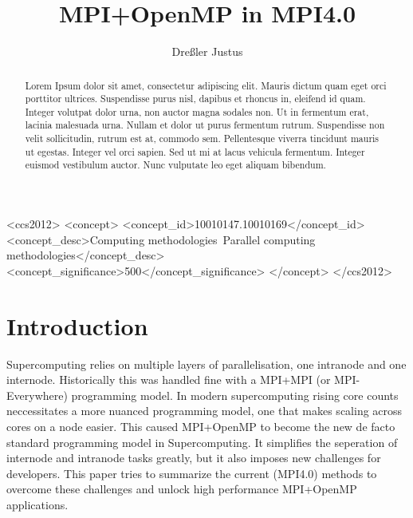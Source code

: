 \documentclass[sigconf]{acmart} %
\begin{document}
\title{MPI+OpenMP in MPI4.0}
\author{Dreßler Justus}


\begin{CCSXML}
    <ccs2012>
    <concept>
    <concept_id>10010147.10010169</concept_id>
    <concept_desc>Computing methodologies~Parallel computing methodologies</concept_desc>
    <concept_significance>500</concept_significance>
    </concept>
    </ccs2012>
\end{CCSXML}


\begin{abstract}

    Lorem Ipsum dolor sit amet, consectetur adipiscing elit.
    Mauris dictum quam eget orci porttitor ultrices.
    Suspendisse purus nisl, dapibus et rhoncus in, eleifend id quam. Integer volutpat dolor urna, non auctor magna sodales non.
    Ut in fermentum erat, lacinia malesuada urna.
    Nullam et dolor ut purus fermentum rutrum.
    Suspendisse non velit sollicitudin, rutrum est at, commodo sem. Pellentesque viverra tincidunt mauris ut egestas.
    Integer vel orci sapien. Sed ut mi at lacus vehicula fermentum.
    Integer euismod vestibulum auctor.
    Nunc vulputate leo eget aliquam bibendum.

\end{abstract}

\maketitle

\section{Introduction}

Supercomputing relies on multiple layers of parallelisation, one intranode and one internode.
Historically this was handled fine with a MPI+MPI (or MPI-Everywhere) programming model.
In modern supercomputing rising core counts neccessitates a more nuanced programming model, one that makes scaling across cores on a node easier.
This caused MPI+OpenMP to become the new de facto standard programming model in Supercomputing.
It simplifies the seperation of internode and intranode tasks greatly, but it also imposes new challenges for developers.
This paper tries to summarize the current (MPI4.0) methods to overcome these challenges and unlock high performance MPI+OpenMP applications.
\end{document}
